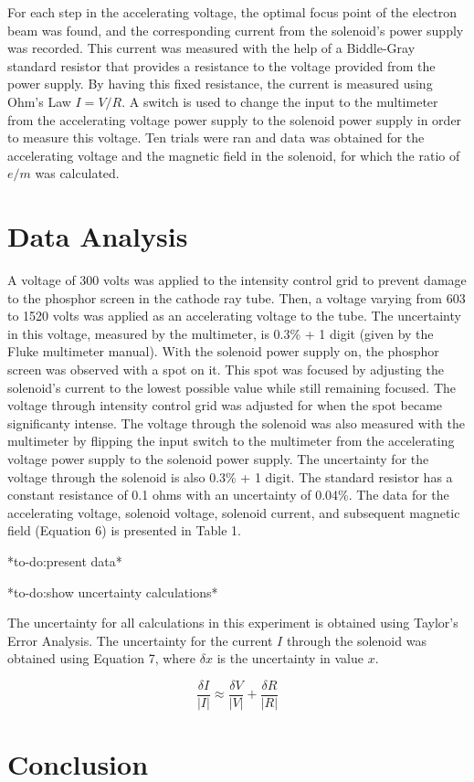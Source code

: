 \documentclass[%
 aip,
 amsmath,amssymb,
 reprint,%
floatfix,
]{revtex4-1}
\begin{document}
For each step in the accelerating voltage, the optimal focus point of the electron beam was found, and the corresponding current from the solenoid's power supply was recorded. This current was measured with the help of a Biddle-Gray standard resistor that provides a resistance to the voltage provided from the power supply. By having this fixed resistance, the current is measured using Ohm's Law $I=V/R$. A switch is used to change the input to the multimeter from the accelerating voltage power supply to the solenoid power supply in order to measure this voltage. Ten trials were ran and data was obtained for the accelerating voltage and the magnetic field in the solenoid, for which the ratio of $e/m$ was calculated.

\section{\label{sec:level4}Data Analysis}

A voltage of 300 volts was applied to the intensity control grid to prevent damage to the phosphor screen in the cathode ray tube. Then, a voltage varying from 603 to 1520 volts was applied as an accelerating voltage to the tube. The uncertainty in this voltage, measured by the multimeter, is 0.3\% + 1 digit (given by the Fluke multimeter manual\cite{Fluke}). With the solenoid power supply on, the phosphor screen was observed with a spot on it. This spot was focused by adjusting the solenoid's current to the lowest possible value while still remaining focused. The voltage through intensity control grid was adjusted for when the spot became significanty intense. The voltage through the solenoid was also measured with the multimeter by flipping the input switch to the multimeter from the accelerating voltage power supply to the solenoid power supply. The uncertainty for the voltage through the solenoid is also 0.3\% + 1 digit. The standard resistor has a constant resistance of 0.1 ohms with an uncertainty of 0.04\%. The data for the accelerating voltage, solenoid voltage, solenoid current, and subsequent magnetic field (Equation 6) is presented in Table 1.

*to-do:present data*

*to-do:show uncertainty calculations*

The uncertainty for all calculations in this experiment is obtained using Taylor's Error Analysis\cite{Taylor1996}. The uncertainty for the current $I$ through the solenoid was obtained using Equation 7, where $\delta x$ is the uncertainty in value $x$.

\begin{equation}
	\frac{\delta I}{\lvert I \rvert} \approx \frac{\delta V}{\lvert V \rvert} + \frac{\delta R}{\lvert R \rvert}
\end{equation}

\section{\label{sec:level5}Conclusion}

\nocite{*}
\end{document}
